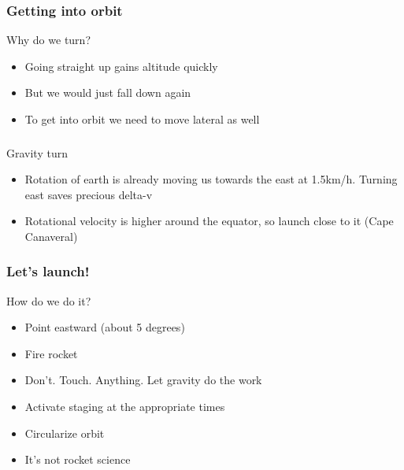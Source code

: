 {
%
\begin{frame}
\end{frame}
\begin{frame}
    \frametitle{Getting into orbit}
    \begin{block}{Why do we turn?}
        \begin{itemize}
            \item Going straight up gains altitude quickly
            \item But we would just fall down again
            \item To get into orbit we need to move lateral as well
        \end{itemize}
    \end{block}
\end{frame}
\begin{frame}
    \frametitle{}
    \begin{block}{Gravity turn}
        \begin{itemize}
            \item Rotation of earth is already moving us towards the east at 1.5km/h. Turning east saves precious delta-v
            \item Rotational velocity is higher around the equator, so launch close to it (Cape Canaveral)
        \end{itemize}
    \end{block}
\end{frame}
\begin{frame}
    \frametitle{Let's launch!}
    \begin{block}{How do we do it?}
        \begin{itemize}
            \item Point eastward (about 5 degrees)
            \item Fire rocket
            \item Don't. Touch. Anything. Let gravity do the work
            \item Activate staging at the appropriate times
            \item Circularize orbit
            \item It's not rocket science
        \end{itemize}
    \end{block}
\end{frame}
}
